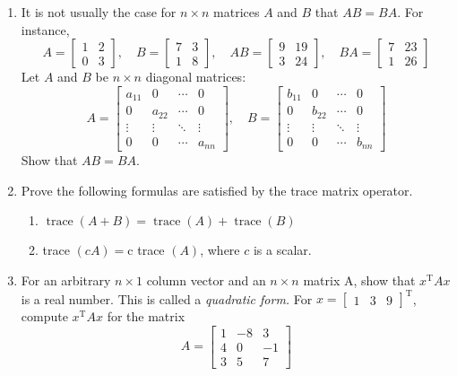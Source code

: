 \documentclass[../main.tex]{subfiles}
\begin{document}
\begin{enumerate}[label=\textbf{1.\arabic*}]
\item It is not usually the case for $n \times n$ matrices $A$ and $B$ that $A B=B A$. For instance,
$$
A=\left[\begin{array}{ll}
1 & 2 \\
0 & 3
\end{array}\right], \quad B=\left[\begin{array}{ll}
7 & 3 \\
1 & 8
\end{array}\right], \quad A B=\left[\begin{array}{ll}
9 & 19 \\
3 & 24
\end{array}\right], \quad B A=\left[\begin{array}{ll}
7 & 23 \\
1 & 26
\end{array}\right]
$$
Let $A$ and $B$ be $n \times n$ diagonal matrices:
$$
A=\left[\begin{array}{cccc}
a_{11} & 0 & \cdots & 0 \\
0 & a_{22} & \cdots & 0 \\
\vdots & \vdots & \ddots & \vdots \\
0 & 0 & \cdots & a_{n n}
\end{array}\right], \quad
B=\left[\begin{array}{cccc}
b_{11} & 0 & \cdots & 0 \\
0 & b_{22} & \cdots & 0 \\
\vdots & \vdots & \ddots & \vdots \\
0 & 0 & \cdots & b_{n n}
\end{array}\right]
$$
Show that $A B=B A$.

\item Prove the following formulas are satisfied by the trace matrix operator.
\label{pro:pro_1_22}

	\begin{enumerate}[label = \textbf{\alph*.}]
		\item  $\operatorname{trace}(A+B)=\operatorname{trace}(A)+\operatorname{trace}(B)$
		\item trace $(c A)=\mathrm{c}$ trace $(A)$, where $c$ is a scalar.
	\end{enumerate}

\item For an arbitrary $n \times 1$ column vector and an $n \times n$ matrix A, show that $x^{\mathrm{T}} A x$ is a real number. This is called a \emph{quadratic form.} For $x=\left[\begin{array}{lll}1 & 3 & 9\end{array}\right]^{\mathrm{T}}$, compute $x^{\mathrm{T}} A x$ for the matrix
$$
A=\left[\begin{array}{ccc}
1 & -8 & 3 \\
4 & 0 & -1 \\
3 & 5 & 7
\end{array}\right]
$$


\end{enumerate}
\end{document}
